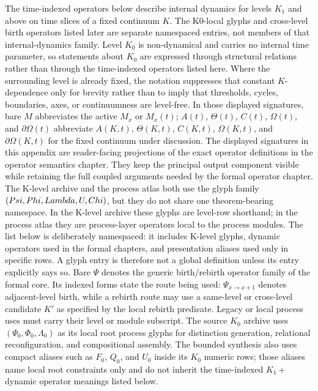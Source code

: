 The time-indexed operators below describe internal dynamics for levels \(K_1\)
and above on time slices of a fixed continuum \(K\). The K0-local glyphs and
cross-level birth operators listed later are separate namespaced entries, not
members of that internal-dynamics family. Level \(K_0\) is non-dynamical and
carries no internal time parameter, so statements about \(K_0\) are expressed
through structural relations rather than through the time-indexed operators
listed here. Where the surrounding level is already fixed, the notation
suppresses that constant \(K\)-dependence only for brevity rather than to imply
that thresholds, cycles, boundaries, axes, or continuumness are level-free.
In those displayed signatures, bare \(M\) abbreviates the active \(M_x\) or
\(M_x(t)\); \(A(t)\), \(\Theta(t)\), \(C(t)\), \(\Omega(t)\), and
\(\partial\Omega(t)\) abbreviate \(A(K,t)\), \(\Theta(K,t)\), \(C(K,t)\),
\(\Omega(K,t)\), and \(\partial\Omega(K,t)\) for the fixed continuum under
discussion.
The displayed signatures in this appendix are reader-facing projections of
the exact operator definitions in the operator semantics chapter. They keep
the principal output component visible while retaining the full coupled
arguments needed by the formal operator chapter.
The K-level archive and the process atlas both use the glyph family
\((Psi,Phi,Lambda,U,Chi)\), but they do not share one theorem-bearing
namespace. In the K-level archive these glyphs are level-row shorthand; in the
process atlas they are process-layer operators local to the process modules.
The list below is deliberately namespaced: it includes K-level glyphs, dynamic
operators used in the formal chapters, and presentation aliases used only in
specific rows. A glyph entry is therefore not a global definition unless its
entry explicitly says so.
Bare \(\Psi\) denotes the generic birth/rebirth operator family of the formal
core. Its indexed forms state the route being used: \(\Psi_{x\to x+1}\)
denotes adjacent-level birth, while a rebirth route may use a same-level or
cross-level candidate \(K'\) as specified by the local rebirth predicate.
Legacy or local process uses must carry their level or module subscript.
The source \(K_0\) archive uses \((\Psi_0,\Phi_0,\Lambda_0)\) as its local
root process glyphs for distinction generation, relational reconfiguration,
and compositional assembly. The bounded synthesis also uses compact aliases such
as \(F_0\), \(Q_0\), and \(U_0\) inside its \(K_0\) numeric rows; those aliases
name local root constraints only and do not inherit the time-indexed \(K_1+\)
dynamic operator meanings listed below.


